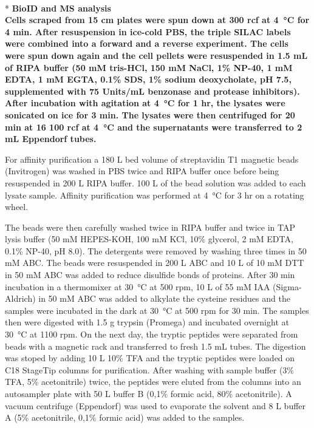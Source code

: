 \\*
\bfseries{BioID and MS analysis}\\
\normalfont Cells scraped from 15 cm plates were spun down at 300 rcf at \SI{4}{\celsius} for 4 min. After resuspension in ice-cold PBS, the triple SILAC labels were combined into a forward and a reverse experiment. The cells were spun down again and the cell pellets were resuspended in 1.5 mL of RIPA buffer (50 mM tris-HCl, 150 mM NaCl, 1\% NP-40, 1 mM EDTA, 1 mM EGTA, 0.1\% SDS, 1\% sodium deoxycholate, pH 7.5, supplemented with 75 Units/mL benzonase and protease inhibitors). After incubation with agitation at \SI{4}{\celsius} for 1 hr, the lysates were sonicated on ice for 3 min. The lysates were then centrifuged for 20 min at 16 100 rcf at \SI{4}{\celsius} and the supernatants were transferred to 2 mL Eppendorf tubes.

For affinity purification a 180 {}\textmu L bed volume of streptavidin T1 magnetic beads (Invitrogen) was washed in PBS twice and RIPA buffer once before being resuspended in 200 {}\textmu L RIPA buffer. 100 {}\textmu L of the bead solution was added to each lysate sample. Affinity purification was performed at \SI{4}{\celsius} for 3 hr on a rotating wheel.

The beads were then carefully washed twice in RIPA buffer and twice in TAP lysis buffer (50 mM HEPES-KOH, 100 mM KCl, 10\% glycerol, 2 mM EDTA, 0.1\% NP-40, pH 8.0). The detergents were removed by washing three times in 50 mM ABC. The beads were resuspended in 200 {}\textmu L ABC and 10 {}\textmu L of 10 mM DTT in 50 mM ABC was added to reduce disulfide bonds of proteins. After 30 min incubation in a thermomixer at \SI{30}{\celsius} at 500 rpm, 10 {}\textmu L of 55 mM IAA (Sigma-Aldrich) in 50 mM ABC was added to alkylate the cysteine residues and the samples were incubated in the dark at \SI{30}{\celsius} at 500 rpm for 30 min. The samples then were digested with 1.5 {}\textmu g trypsin (Promega) and incubated overnight at \SI{30}{\celsius} at 1100 rpm. On the next day, the tryptic peptides were separated from beads with a magnetic rack and transferred to fresh 1.5 mL tubes. The digestion was stoped by adding 10 {}\textmu L 10\% TFA and the tryptic peptides were loaded on C18 StageTip columns for purification. After washing with sample buffer (3\% TFA, 5\% acetonitrile) twice, the peptides were eluted from the columns into an autosampler plate with 50 {}\textmu L buffer B (0,1\% formic acid, 80\% acetonitrile). A vacuum centrifuge (Eppendorf) was used to evaporate the solvent and 8 {}\textmu L buffer A (5\% acetonitrile, 0,1\% formic acid) was added to the samples.

